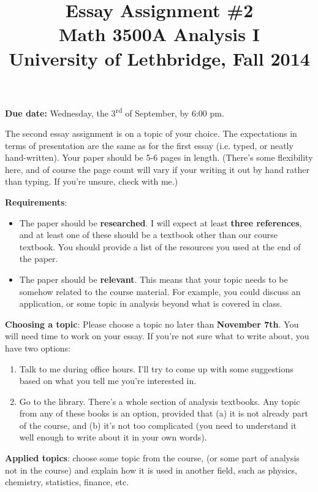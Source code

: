 \documentclass[letterpaper,12pt]{amsart}
\title{Essay Assignment \#2\\Math 3500A Analysis I\\University of Lethbridge, Fall 2014}
\date{}
\begin{document}
\maketitle

 {\bf Due date:} Wednesday, the 3\textsuperscript{rd} of September, by 6:00 pm.

\bigskip

The second essay assignment is on a topic of your choice. The expectations in terms of presentation are the same as for the first essay (i.e. typed, or neatly hand-written). Your paper should be 5-6 pages in length. (There's some flexibility here, and of course the page count will vary if your writing it out by hand rather than typing. If you're unsure, check with me.)

{\bf Requirements}: 
\begin{itemize}
 \item The paper should be {\bf researched}. I will expect at least {\bf three references}, and at least one of these should be a textbook other than our course textbook. You should provide a list of the resources you used at the end of the paper.
 \item The paper should be {\bf relevant}. This means that your topic needs to be somehow related to the course material. For example, you could discuss an application, or some topic in analysis beyond what is covered in class.
\end{itemize}


{\bf Choosing a topic}: Please choose a topic no later than {\bf November 7th}. You will need time to work on your essay. If you're not sure what to write about, you have two options:
\begin{enumerate}
 \item Talk to me during office hours. I'll try to come up with some suggestions based on what you tell me you're interested in.
 \item Go to the library. There's a whole section of analysis textbooks. Any topic from any of these books is an option, provided that (a) it is not already part of the course, and (b) it's not too complicated (you need to understand it well enough to write about it in your own words).
\end{enumerate}

{\bf Applied topics}: choose some topic from the course, (or some part of analysis not in the course) and explain how it is used in another field, such as physics, chemistry, statistics, finance, etc.
\end{document}
